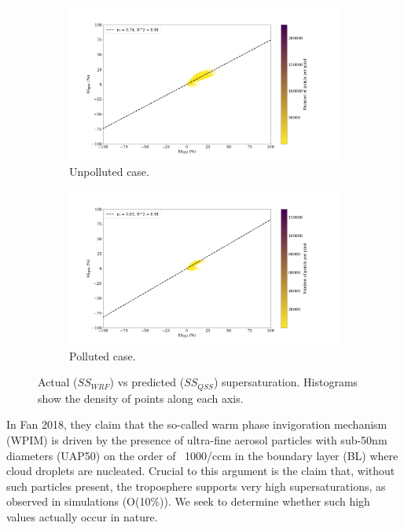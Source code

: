 \documentclass{article}
\begin{document}
\begin{figure}[ht]
	\centering
	\begin{subfigure}{0.7\textwidth}
		\includegraphics[width=\textwidth]{revmywrf/v12_heatmap_ss_qss_vs_ss_wrf_Unpolluted_figure.png}
		\caption{Unpolluted case.}
		\label{wrfvsqssunpoll}
	\end{subfigure}
	\begin{subfigure}{0.7\textwidth}
		\includegraphics[width=\textwidth]{revmywrf/v12_heatmap_ss_qss_vs_ss_wrf_Polluted_figure.png}
		\caption{Polluted case.}
		\label{wrfvsqsspoll}
	\end{subfigure}
	\caption{Actual ($SS_{WRF}$) vs predicted ($SS_{QSS}$) supersaturation. Histograms show the density of points along each axis.}
	\label{wrfvsqss}
\end{figure}

In Fan 2018, they claim that the so-called warm phase invigoration mechanism (WPIM) is driven by the presence of ultra-fine aerosol particles with sub-50nm diameters (UAP50) on the order of ~1000/ccm in the boundary layer (BL) where cloud droplets are nucleated. Crucial to this argument is the claim that, without such particles present, the troposphere supports very high supersaturations, as observed in simulations (O(10\%)). We seek to determine whether such high values actually occur in nature.
\end{document}
